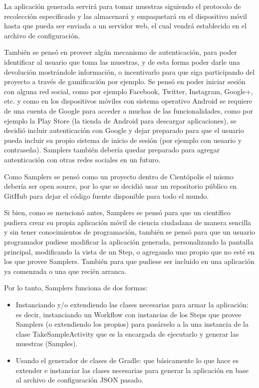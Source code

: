 La aplicación generada servirá para tomar muestras siguiendo el protocolo de recolección especificado y las almacenará y empaquetará en el dispositivo móvil hasta que pueda ser enviada a un servidor web, el cual vendrá establecido en el archivo de configuración.

También se pensó en proveer algún mecanismo de autenticación, para poder identificar al usuario que toma las muestras, y de esta forma poder darle una devolución mostrándole información, o incentivarlo para que siga participando del proyecto a través de gamificación por ejemplo.
Se pensó en poder iniciar sesión con alguna red social, como por ejemplo Facebook, Twitter, Instagram, Google+, etc. y como en los dispositivos móviles con sistema operativo Android se requiere de una cuenta de Google para acceder a muchas de las funcionalidades, como por ejemplo la Play Store (la tienda de Android para descargar aplicaciones), se decidió incluir autenticación con Google y dejar preparado para que el usuario pueda incluir su propio sistema de inicio de sesión (por ejemplo con usuario y contraseña). Samplers también debería quedar preparado para agregar autenticación con otras redes sociales en un futuro.

Como Samplers se pensó como un proyecto dentro de Cientópolis\cite{cientopolis} el mismo debería ser open source, por lo que se decidió usar un repositorio público en GitHub\cite{github} para dejar el código fuente disponible para todo el mundo.

Si bien, como se mencionó antes, Samplers se pensó para que un científico pudiera crear su propia aplicación móvil de ciencia ciudadana de manera sencilla y sin tener conocimientos de programación, también se pensó para que un usuario programador pudiese modificar la aplicación generada, personalizando la pantalla principal, modificando la vista de un Step, o agregando uno propio que no esté en los que provee Samplers. También para que pudiese ser incluido en una aplicación ya comenzada o una que recién arranca.

Por lo tanto, Samplers funciona de dos formas:
\begin{itemize}
\item Instanciando y/o extendiendo las clases necesarias para armar la aplicación: es decir, instanciando un Workflow con instancias de los Steps que provee Samplers (o extendiendo los propios) para pasárselo a la una instancia de la clase TakeSampleActivity que es la encargada de ejecutarlo y generar las muestras (Samples).
\item Usando el generador de clases de Gradle: que básicamente lo que hace es extender e instanciar las clases necesarias para generar la aplicación en base al archivo de configuración JSON pasado. 
\end{itemize}



